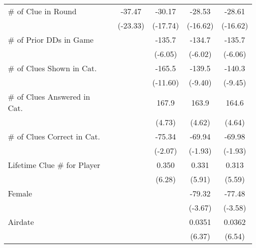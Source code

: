\begin{table}[htbp]
\begin{tabular}{l*{5}{c}}
\# of Clue in Round&                     &      -37.47\sym{***}&      -30.17\sym{***}&      -28.53\sym{***}&      -28.61\sym{***}\\
            &                     &    (-23.33)         &    (-17.74)         &    (-16.62)         &    (-16.62)         \\
\# of Prior DDs in Game&                     &                     &      -135.7\sym{***}&      -134.7\sym{***}&      -135.7\sym{***}\\
            &                     &                     &     (-6.05)         &     (-6.02)         &     (-6.06)         \\
\# of Clues Shown in Cat.&                     &                     &      -165.5\sym{***}&      -139.5\sym{***}&      -140.3\sym{***}\\
            &                     &                     &    (-11.60)         &     (-9.40)         &     (-9.45)         \\
\# of Clues Answered in Cat.&                     &                     &       167.9\sym{***}&       163.9\sym{***}&       164.6\sym{***}\\
            &                     &                     &      (4.73)         &      (4.62)         &      (4.64)         \\
\# of Clues Correct in Cat.&                     &                     &      -75.34\sym{*}  &      -69.94         &      -69.98         \\
            &                     &                     &     (-2.07)         &     (-1.93)         &     (-1.93)         \\
Lifetime Clue \# for Player&                     &                     &       0.350\sym{***}&       0.331\sym{***}&       0.313\sym{***}\\
            &                     &                     &      (6.28)         &      (5.91)         &      (5.59)         \\
Female      &                     &                     &                     &      -79.32\sym{***}&      -77.48\sym{***}\\
            &                     &                     &                     &     (-3.67)         &     (-3.58)         \\
Airdate     &                     &                     &                     &      0.0351\sym{***}&      0.0362\sym{***}\\
            &                     &                     &                     &      (6.37)         &      (6.54)         \\

\end{tabular}
\end{table}
